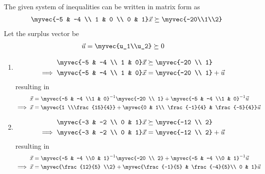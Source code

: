 The given system of inequalities can be written in matrix form as
\begin{align}
    \myvec{-5 & -4 \\ 1 & 0 \\ 0 & 1}\vec{x} \succeq \myvec{-20\\1\\2}
\end{align}
Let the surplus vector be
\begin{align}
    \vec{u} &= \myvec{u_1\\u_2} \succeq 0
\end{align}
\begin{enumerate}
    \item 
    \begin{align}
        \myvec{-5 & -4 \\ 1 & 0}\vec{x} &\succeq \myvec{-20 \\ 1}
        \\
        \implies  \myvec{-5 & -4 \\ 1 & 0}\vec{x} &= \myvec{-20 \\ 1} + \vec{u}
    \end{align}
    resulting in 
    \begin{align}
        \vec{x} &= \myvec{-5 & -4 \\1 & 0}^{-1}\myvec{-20 \\ 1} + \myvec{-5 & -4 \\1 & 0}^{-1}\vec{u}
        \\
        \implies \vec{x} &= \myvec{1 \\\frac{15}{4}} + \myvec{0 & 1\\ \frac{-1}{4} & \frac{-5}{4}}\vec{u}   \label{/2/47eq1}
    \end{align}
    \item 
    \begin{align}
        \myvec{-3 & -2 \\ 0 & 1}\vec{x} &\succeq \myvec{-12 \\ 2}
        \\
        \implies  \myvec{-3 & -2 \\ 0 & 1}\vec{x} &= \myvec{-12 \\ 2} + \vec{u}
    \end{align}
    resulting in 
    \begin{align}
        \vec{x} &= \myvec{-5 & -4 \\0 & 1}^{-1}\myvec{-20 \\ 2} + \myvec{-5 & -4 \\0 & 1}^{-1}\vec{u}
        \\
        \implies \vec{x} &= \myvec{\frac{12}{5} \\2} + \myvec{\frac{-1}{5} & \frac{-4}{5}\\ 0 & 1}\vec{u} \label{/2/47eq2}
    \end{align}
\end{enumerate}

